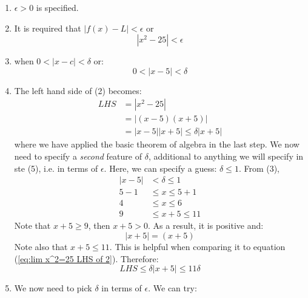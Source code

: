 \begin{itemize}
\begin{example}
        \begin{enumerate}
            \item $\epsilon>0$ is specified.
            \item It is required that $|f(x)-L|<\epsilon$ or
            \begin{equation}
                |x^2-25|<\epsilon
                \label{eq:x^2-25epsilon}
            \end{equation}
            \item when $0<|x-c|<\delta$ or:
            \begin{equation}
                0<|x-5|<\delta
                \label{eq:}
            \end{equation}
            \item The left hand side of (2) becomes:
            \begin{align}
                LHS &= |x^2-25| \\ 
                &= |(x-5)(x+5)| \\ 
                &= |x-5||x+5|
                \le \delta |x+5|
                \label{eq:lim x^2=25 LHS of 2}
            \end{align}
            where we have applied the basic theorem of algebra in the last step. We now need to specify a \textit{second} feature of $\delta$, additional to anything we will specify in ste (5), i.e. in terms of $\epsilon$. Here, we can specify a guess: $\delta \le 1$. From (3),
            \begin{align}
                |x-5|&<\delta \le 1 \\ 
                5-1 &\le x \le 5+1 \\ 
                4 &\le x \le 6 \\ 
                9 &\le x+5 \le 11
                \label{eq:}
            \end{align}
            Note that $x+5 \ge 9$, then $x+5>0$. As a result, it is positive and:
            \begin{equation}
                |x+5|=(x+5)
                \label{eq:}
            \end{equation}
            Note also that $x+5 \le 11$. This is helpful when comparing it to equation (\ref{eq:lim x^2=25 LHS of 2}). Therefore:
            \begin{equation}
                LHS\le \delta |x+5| \le 11\delta
                \label{eq:}
            \end{equation}
            \item We now need to pick $\delta$ in terms of $\epsilon$. We can try:

\end{enumerate}
\end{example}
\end{itemize}
